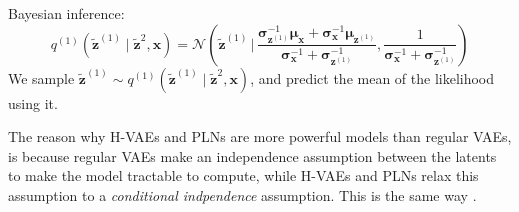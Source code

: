 \documentclass{article}
\renewcommand{\vec}[1]{\mathbf{#1}}
\newcommand{\Norm}[1]{\mathcal{N}\left( #1 \right)}
\newcommand{\MU}{\boldsymbol\mu}
\newcommand{\SIGMA}{\boldsymbol\sigma}
\begin{document}
Bayesian inference\footnotemark:
\[
  q^{(1)}(\vec{\tilde{z}}^{(1)} \mid \vec{\tilde{z}}^{2}, \vec{x}) =
  \Norm{\vec{\tilde{z}}^{(1)} \,\bigg|\,
    \frac{\SIGMA_{\vec{z}^{(1)}}^{-1} \MU_{\vec{x}} + \SIGMA_{\vec{x}}^{-1}
      \MU_{\vec{z}^{(1)}}}{\SIGMA_{\vec{x}}^{-1} + \SIGMA_{\vec{z}^{(1)}}^{-1}
    },
  \frac{1}{\SIGMA_{\vec{x}}^{-1} + \SIGMA_{\vec{z}^{(1)}}^{-1} }}
\]
We sample $\vec{\tilde{z}}^{(1)} \sim q^{(1)}(\vec{\tilde{z}}^{(1)} \mid
\vec{\tilde{z}}^{2}, \vec{x})$, and predict the mean of the likelihood using it.
\par 
The reason why H-VAEs and PLNs are more powerful models than regular VAEs, is
because regular VAEs make an independence assumption between the latents to make
the model tractable to compute, while H-VAEs and PLNs relax this assumption to a
\textit{conditional indpendence} assumption. This is the same way
\cite{balle2018variational}.
\end{document}
